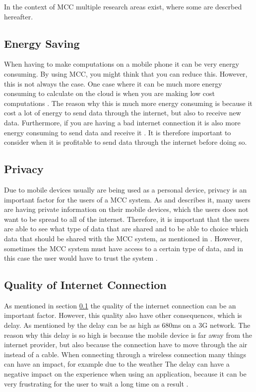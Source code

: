 In the context of MCC multiple research areas exist, where some are descrbed hereafter.
\subsection{Energy Saving}\label{EnergySaving}
When having to make computations on a mobile phone it can be very energy consuming.
By using MCC, you might think that you can reduce this.
However, this is not always the case.
One case where it can be much more energy consuming to calculate on the cloud is when you are making low cost computations \citep{goyalmobile,liu2013gearing,fernando2013mobile}.
The reason why this is much more energy consuming is because it cost a lot of energy to send data through the internet, but also to receive new data.
Furthermore, if you are having a bad internet connection it is also more energy consuming to send data and receive it \citep{goyalmobile,liu2013gearing,fernando2013mobile}.
It is therefore important to consider when it is profitable to send data through the internet before doing so.

\subsection{Privacy}
Due to mobile devices usually are being used as a personal device, privacy is an important factor for the users of a MCC system.
As \citet{liu2013gearing} and \citet{fernando2013mobile} describes it, many users are having private information on their mobile devices, which the users does not want to be spread to all of the internet.
Therefore, it is important that the users are able to see what type of data that are shared and to be able to choice which data that should be shared with the MCC system, as mentioned in \citet{sanaei2014heterogeneity}.
However, sometimes the MCC system must have access to a certain type of data, and in this case the user would have to trust the system \citep{fernando2013mobile}.

\subsection{Quality of Internet Connection}
As mentioned in section \ref{EnergySaving} the quality of the internet connection can be an important factor.
However, this quality also have other consequences, which is delay.
As mentioned by \citep{fernando2013mobile} the delay can be as high as 680ms on a 3G network.
The reason why this delay is so high is because the mobile device is far away from the internet provider, but also because the connection have to move through the air instead of a cable.
When connecting through a wireless connection many things can have an impact, for example due to the weather \citep{dev2014review,kumar2013mobile}
The delay can have a negative impact on the experience when using an application, because it can be very frustrating for the user to wait a long time on a result \citep{hazarika2014mobile}.

